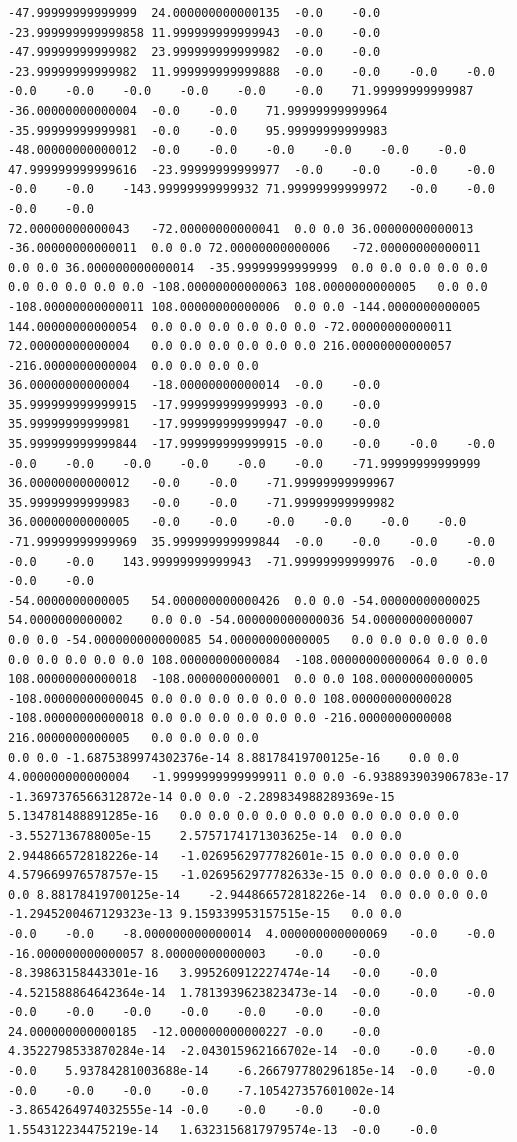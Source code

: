 \documentclass[12pt]{report} %
\begin{document}
\begin{landscape}
\begin{lstlisting}[numbers=none, basicstyle=\ttfamily\tiny, captionpos=b, caption={Matriz de coeficientes $W = G^{-1}$ ($54\times54$) calculada con Julia, sin redondear.}, label=cod:W-julia]
-47.99999999999999	24.000000000000135	-0.0	-0.0	-23.999999999999858	11.999999999999943	-0.0	-0.0	-47.99999999999982	23.999999999999982	-0.0	-0.0	-23.99999999999982	11.999999999999888	-0.0	-0.0	-0.0	-0.0	-0.0	-0.0	-0.0	-0.0	-0.0	-0.0	71.99999999999987	-36.00000000000004	-0.0	-0.0	71.99999999999964	-35.99999999999981	-0.0	-0.0	95.99999999999983	-48.00000000000012	-0.0	-0.0	-0.0	-0.0	-0.0	-0.0	47.999999999999616	-23.99999999999977	-0.0	-0.0	-0.0	-0.0	-0.0	-0.0	-143.99999999999932	71.99999999999972	-0.0	-0.0	-0.0	-0.0
72.00000000000043	-72.00000000000041	0.0	0.0	36.00000000000013	-36.00000000000011	0.0	0.0	72.00000000000006	-72.00000000000011	0.0	0.0	36.000000000000014	-35.99999999999999	0.0	0.0	0.0	0.0	0.0	0.0	0.0	0.0	0.0	0.0	-108.00000000000063	108.0000000000005	0.0	0.0	-108.00000000000011	108.00000000000006	0.0	0.0	-144.0000000000005	144.00000000000054	0.0	0.0	0.0	0.0	0.0	0.0	-72.00000000000011	72.00000000000004	0.0	0.0	0.0	0.0	0.0	0.0	216.00000000000057	-216.0000000000004	0.0	0.0	0.0	0.0
36.00000000000004	-18.00000000000014	-0.0	-0.0	35.999999999999915	-17.999999999999993	-0.0	-0.0	35.99999999999981	-17.999999999999947	-0.0	-0.0	35.999999999999844	-17.999999999999915	-0.0	-0.0	-0.0	-0.0	-0.0	-0.0	-0.0	-0.0	-0.0	-0.0	-71.99999999999999	36.00000000000012	-0.0	-0.0	-71.99999999999967	35.99999999999983	-0.0	-0.0	-71.99999999999982	36.00000000000005	-0.0	-0.0	-0.0	-0.0	-0.0	-0.0	-71.99999999999969	35.999999999999844	-0.0	-0.0	-0.0	-0.0	-0.0	-0.0	143.99999999999943	-71.99999999999976	-0.0	-0.0	-0.0	-0.0
-54.0000000000005	54.000000000000426	0.0	0.0	-54.00000000000025	54.0000000000002	0.0	0.0	-54.000000000000036	54.00000000000007	0.0	0.0	-54.000000000000085	54.00000000000005	0.0	0.0	0.0	0.0	0.0	0.0	0.0	0.0	0.0	0.0	108.00000000000084	-108.00000000000064	0.0	0.0	108.00000000000018	-108.0000000000001	0.0	0.0	108.0000000000005	-108.00000000000045	0.0	0.0	0.0	0.0	0.0	0.0	108.00000000000028	-108.00000000000018	0.0	0.0	0.0	0.0	0.0	0.0	-216.0000000000008	216.0000000000005	0.0	0.0	0.0	0.0
0.0	0.0	-1.6875389974302376e-14	8.88178419700125e-16	0.0	0.0	4.000000000000004	-1.9999999999999911	0.0	0.0	-6.938893903906783e-17	-1.3697376566312872e-14	0.0	0.0	-2.289834988289369e-15	5.134781488891285e-16	0.0	0.0	0.0	0.0	0.0	0.0	0.0	0.0	0.0	0.0	-3.5527136788005e-15	2.5757174171303625e-14	0.0	0.0	2.944866572818226e-14	-1.0269562977782601e-15	0.0	0.0	0.0	0.0	4.579669976578757e-15	-1.0269562977782633e-15	0.0	0.0	0.0	0.0	0.0	0.0	8.88178419700125e-14	-2.944866572818226e-14	0.0	0.0	0.0	0.0	-1.2945200467129323e-13	9.159339953157515e-15	0.0	0.0
-0.0	-0.0	-8.000000000000014	4.000000000000069	-0.0	-0.0	-16.000000000000057	8.00000000000003	-0.0	-0.0	-8.39863158443301e-16	3.995260912227474e-14	-0.0	-0.0	-4.521588864642364e-14	1.7813939623823473e-14	-0.0	-0.0	-0.0	-0.0	-0.0	-0.0	-0.0	-0.0	-0.0	-0.0	24.000000000000185	-12.000000000000227	-0.0	-0.0	4.3522798533870284e-14	-2.043015962166702e-14	-0.0	-0.0	-0.0	-0.0	5.93784281003688e-14	-6.266797780296185e-14	-0.0	-0.0	-0.0	-0.0	-0.0	-0.0	-7.105427357601002e-14	-3.8654264974032555e-14	-0.0	-0.0	-0.0	-0.0	1.554312234475219e-14	1.6323156817979574e-13	-0.0	-0.0

\end{lstlisting}
\end{landscape}
\end{document}

